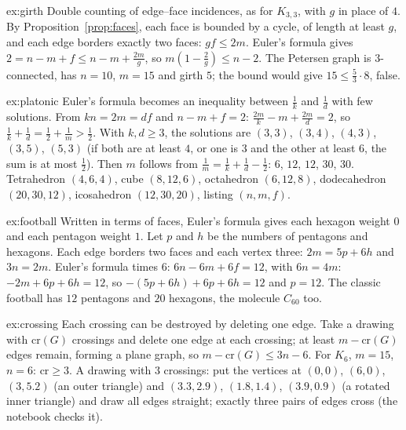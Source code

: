 \begin{solution}{ex:girth}
\idea Double counting of edge--face incidences, as for $K_{3,3}$, with $g$ in place of $4$.
\writeup By Proposition~\ref{prop:faces}, each face is bounded by a cycle, of length at least $g$, and each edge borders exactly two faces: $gf\le2m$. Euler's formula gives
$2=n-m+f\le n-m+\frac{2m}g$, so $m(1-\frac2g)\le n-2$. The Petersen graph is $3$-connected, has $n=10$, $m=15$ and girth $5$; the bound would give $15\le\frac53\cdot8$, false.
\end{solution}

\begin{solution}{ex:platonic}
\idea Euler's formula becomes an inequality between $\frac1k$ and $\frac1d$ with few solutions.
\writeup From $kn=2m=df$ and $n-m+f=2$: $\frac{2m}k-m+\frac{2m}d=2$, so $\frac1k+\frac1d=\frac12+\frac1m>\frac12$. With $k,d\ge3$, the solutions are $(3,3)$, $(3,4)$, $(4,3)$, $(3,5)$, $(5,3)$ (if
both are at least $4$, or one is $3$ and the other at least $6$, the sum is at most $\frac12$). Then $m$ follows from $\frac1m=\frac1k+\frac1d-\frac12$: $6$, $12$, $12$, $30$, $30$. Tetrahedron
$(4,6,4)$, cube $(8,12,6)$, octahedron $(6,12,8)$, dodecahedron $(20,30,12)$, icosahedron $(12,30,20)$, listing $(n,m,f)$.
\end{solution}

\begin{solution}{ex:football}
\idea Written in terms of faces, Euler's formula gives each hexagon weight $0$ and each pentagon weight $1$.
\writeup Let $p$ and $h$ be the numbers of pentagons and hexagons. Each edge borders two faces and each vertex three: $2m=5p+6h$ and $3n=2m$. Euler's formula times $6$:
$6n-6m+6f=12$, with $6n=4m$: $-2m+6p+6h=12$, so $-(5p+6h)+6p+6h=12$ and $p=12$. The classic football has $12$ pentagons and $20$ hexagons, the molecule $C_{60}$ too.
\end{solution}

\begin{solution}{ex:crossing}
\idea Each crossing can be destroyed by deleting one edge.
\writeup Take a drawing with $\mathrm{cr}(G)$ crossings and delete one edge at each crossing; at least $m-\mathrm{cr}(G)$ edges remain, forming a plane graph, so $m-\mathrm{cr}(G)\le3n-6$.
For $K_6$, $m=15$, $n=6$: $\mathrm{cr}\ge3$. A drawing with $3$ crossings: put the vertices at $(0,0)$, $(6,0)$, $(3,5.2)$ (an outer triangle) and $(3.3,2.9)$, $(1.8,1.4)$, $(3.9,0.9)$ (a
rotated inner triangle) and draw all edges straight; exactly three pairs of edges cross (the notebook checks it).
\end{solution}

